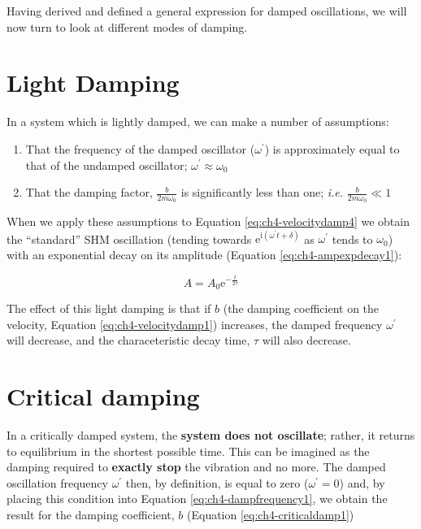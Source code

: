 \documentclass[
]{book}
\providecommand{\tightlist}{%
  \setlength{\itemsep}{0pt}\setlength{\parskip}{0pt}}
\begin{document}
Having derived and defined a general expression for damped oscillations, we will now turn to look at different modes of damping.

\hypertarget{sec:ch4-lightdamping}{%
\section{Light Damping}\label{sec:ch4-lightdamping}}

In a system which is lightly damped, we can make a number of assumptions:

\begin{enumerate}
\def\labelenumi{\arabic{enumi}.}
\tightlist
\item
  That the frequency of the damped oscillator (\(\omega ^\prime\)) is approximately equal to that of the undamped oscillator; \(\omega ^\prime \approx \omega_0\)
\item
  That the damping factor, \(\frac{b}{2m\omega_0}\) is significantly less than one; \emph{i.e.} \(\frac{b}{2m\omega_0} \ll 1\)
\end{enumerate}

When we apply these assumptions to Equation \eqref{eq:ch4-velocitydamp4} we obtain the ``standard'' SHM oscillation (tending towards \(\mathrm{e}^{\mathrm{i}(\omega^\prime t + \delta)}\) as \(\omega ^\prime\) tends to \(\omega_0\)) with an exponential decay on its amplitude (Equation \eqref{eq:ch4-ampexpdecay1}):

\begin{equation}
A = A_0 \mathrm{e}^{-\frac{t}{2\tau}}
\label{eq:ch4-ampexpdecay1}
\end{equation}

The effect of this light damping is that if \(b\) (the damping coefficient on the velocity, Equation \eqref{eq:ch4-velocitydamp1}) increases, the damped frequency \(\omega^\prime\) will decrease, and the characeteristic decay time, \(\tau\) will also decrease.

\hypertarget{sec:ch4-criticaldamping}{%
\section{Critical damping}\label{sec:ch4-criticaldamping}}

In a critically damped system, the \textbf{system does not oscillate}; rather, it returns to equilibrium in the shortest possible time. This can be imagined as the damping required to \textbf{exactly stop} the vibration and no more. The damped oscillation frequency \(\omega^\prime\) then, by definition, is equal to zero (\(\omega^\prime = 0\)) and, by placing this condition into Equation \eqref{eq:ch4-dampfrequency1}, we obtain the result for the damping coefficient, \(b\) (Equation \eqref{eq:ch4-criticaldamp1})
\end{document}
